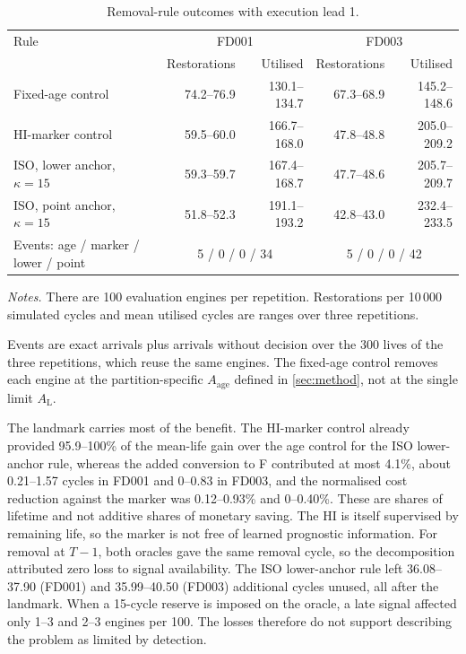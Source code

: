 \documentclass[preprint,12pt]{elsarticle}
\newcommand{\tablenotes}[1]{\par\smallskip\begin{minipage}{\linewidth}\footnotesize\raggedright\setlength{\parindent}{0pt}\setlength{\parskip}{0.35\baselineskip}\textit{Notes.} #1\end{minipage}}
\begin{document}
\begin{table}[htbp]
\centering
\caption{Removal-rule outcomes with execution lead 1.}
\label{tab:removal-rules}
\footnotesize
\setlength{\tabcolsep}{3.5pt}
\setlength{\tabcolsep}{3pt}
\begin{tabularx}{\linewidth}{@{}Xrrrr@{}}
\toprule
Rule & \multicolumn{2}{c}{FD001} & \multicolumn{2}{c}{FD003} \\
 & Restorations & Utilised & Restorations & Utilised \\
\midrule
Fixed-age control & 74.2--76.9 & 130.1--134.7 & 67.3--68.9 & 145.2--148.6 \\
HI-marker control & 59.5--60.0 & 166.7--168.0 & 47.8--48.8 & 205.0--209.2 \\
ISO, lower anchor, $\kappa=15$ & 59.3--59.7 & 167.4--168.7 & 47.7--48.6 & 205.7--209.7 \\
ISO, point anchor, $\kappa=15$ & 51.8--52.3 & 191.1--193.2 & 42.8--43.0 & 232.4--233.5 \\
\midrule
Events: age / marker / lower / point & \multicolumn{2}{c}{5 / 0 / 0 / 34} & \multicolumn{2}{c}{5 / 0 / 0 / 42} \\
\bottomrule
\end{tabularx}
\tablenotes{There are 100 evaluation engines per repetition. Restorations per 10\,000 simulated cycles and mean utilised cycles are ranges over three repetitions.

Events are exact arrivals plus arrivals without decision over the 300 lives of the three repetitions, which reuse the same engines. The fixed-age control removes each engine at the partition-specific $A_{\mathrm{age}}$ defined in \cref{sec:method}, not at the single limit $A_{\mathrm L}$.}
\end{table}

The landmark carries most of the benefit. The HI-marker control already provided 95.9--100\% of the mean-life gain over the age control for the ISO lower-anchor rule, whereas the added conversion to F contributed at most 4.1\%, about 0.21--1.57 cycles in FD001 and 0--0.83 in FD003, and the normalised cost reduction against the marker was 0.12--0.93\% and 0--0.40\%. These are shares of lifetime and not additive shares of monetary saving. The HI is itself supervised by remaining life, so the marker is not free of learned prognostic information. For removal at $T-1$, both oracles gave the same removal cycle, so the decomposition attributed zero loss to signal availability. The ISO lower-anchor rule left 36.08--37.90 (FD001) and 35.99--40.50 (FD003) additional cycles unused, all after the landmark. When a 15-cycle reserve is imposed on the oracle, a late signal affected only 1--3 and 2--3 engines per 100. The losses therefore do not support describing the problem as limited by detection.
\end{document}
